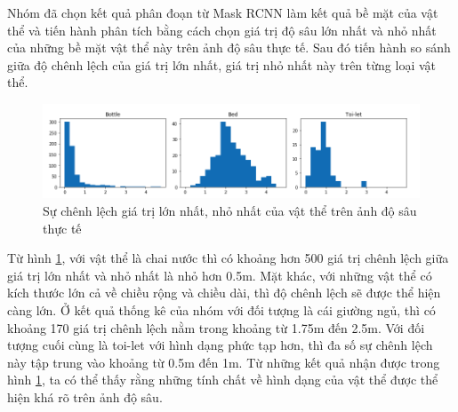 Nhóm đã chọn kết quả phân đoạn từ Mask RCNN làm kết quả bề mặt của vật thể  và tiến hành phân tích bằng cách chọn giá trị độ sâu lớn nhất và nhỏ nhất của những bề mặt vật thể này trên ảnh độ sâu thực tế. Sau đó tiến hành so sánh giữa độ chênh lệch của giá trị lớn nhất, giá trị nhỏ nhất này trên từng loại vật thể.
\begin{center}
   \begin{figure}[H]
   \begin{center}
   \includegraphics[scale=0.55]{image/gtminmax}
   \end{center}
   \caption{Sự chênh lệch giá trị lớn nhất, nhỏ nhất của vật thể trên ảnh độ sâu thực tế}
   \label{fig:gtminmax}
   \end{figure}
 \end{center} 
 
 Từ hình \ref{fig:gtminmax}, với vật thể là chai nước thì có khoảng hơn 500 giá trị chênh lệch giữa giá trị lớn nhất và nhỏ nhất là nhỏ hơn 0.5m. Mặt khác, với những vật thể có kích thước lớn cả về chiều rộng và chiều dài, thì độ chênh lệch sẽ được thể hiện càng lớn. Ở kết quả thống kê của nhóm với đối tượng là cái giường ngủ, thì có khoảng 170 giá trị chênh lệch nằm trong khoảng từ 1.75m đến 2.5m. Với đối tượng cuối cùng là toi-let với hình dạng phức tạp hơn, thì đa số sự chênh lệch này tập trung vào khoảng từ 0.5m đến 1m. Từ những kết quả nhận được trong hình \ref{fig:gtminmax}, ta có thể thấy rằng những tính chất về hình dạng của vật thể  được thể hiện khá rõ trên ảnh độ sâu. 

 
 